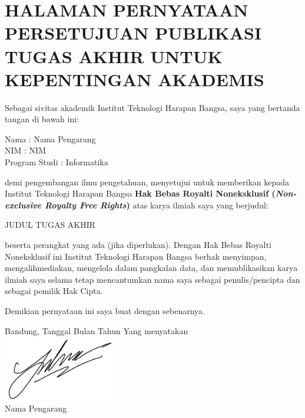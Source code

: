 \chapter*{\large HALAMAN PERNYATAAN PERSETUJUAN PUBLIKASI TUGAS AKHIR UNTUK KEPENTINGAN AKADEMIS}
	
	\noindent Sebagai sivitas akademik Institut Teknologi Harapan Bangsa, saya yang bertanda tangan di bawah ini:

	\begin{tabs}{3cm}
		\noindent Nama \tab : Nama Pengarang\\
		NIM \tab : NIM\\
		Program Studi \tab : Informatika
	\end{tabs}
		
	\noindent demi pengembangan ilmu pengetahuan, menyetujui untuk memberikan kepada Institut Teknologi Harapan Bangsa \textbf{Hak Bebas Royalti Noneksklusif (\textit{Non-exclusive Royalty Free Rights})} atas karya ilmiah saya yang berjudul:
		
	\noindent JUDUL TUGAS AKHIR
		
	\noindent beserta perangkat yang ada (jika diperlukan). Dengan Hak Bebas Royalti Noneksklusif ini Institut Teknologi Harapan Bangsa berhak menyimpan, mengalihmediakan, mengelola dalam pangkalan data, dan memublikasikan karya ilmiah saya selama tetap mencantumkan nama saya sebagai penulis/pencipta dan sebagai pemilik Hak Cipta.
		
	\noindent Demikian pernyataan ini saya buat dengan sebenarnya.
	
	\noindent Bandung, Tanggal Bulan Tahun \newline
	\noindent Yang menyatakan \\
 	\includegraphics[width=5cm]{img/sign.png}\\
	\noindent Nama Pengarang